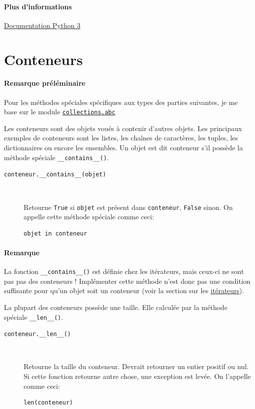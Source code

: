 \documentclass[a4paper, 10pt]{article}
\begin{document}
\paragraph{Plus d'informations} \href{https://docs.python.org/3/howto/descriptor.html}{Documentation Python 3}





\section{Conteneurs}

\paragraph{Remarque préléminaire} Pour les méthodes spéciales spécifiques aux types des parties suivantes, je me base sur le module \hyperref[abc]{\texttt{collections.abc}}\bigskip


Les conteneurs sont des objets voués à contenir d'autres objets. Les principaux exemples de conteneurs sont les listes, les chaînes de caractères, les tuples, les dictionnaires ou encore les ensembles. Un objet est dit conteneur s'il possède la méthode spéciale \texttt{__contains__()}.

\begin{description}
    \item[\texttt{conteneur.__contains__(objet)}]~

    Retourne \texttt{True} si \texttt{objet} est présent dans \texttt{conteneur}, \texttt{False} sinon. On appelle cette méthode spéciale comme ceci:
    \begin{verbatim}
objet in conteneur
    \end{verbatim}
\end{description}

\paragraph{Remarque} La fonction \texttt{__contains__()} est définie chez les itérateurs, mais ceux-ci ne sont pas pas des conteneurs ! Implémenter cette méthode n'est donc pas une condition suffisante pour qu'un objet soit un conteneur (voir la section sur les \hyperref[iterateur]{itérateurs}).\bigskip

La plupart des conteneurs possède une taille. Elle calculée par la méthode spéciale \texttt{__len__()}.
\begin{description}
    \item[\texttt{conteneur.__len__()}]~

    Retourne la taille du conteneur. Devrait retourner un entier positif ou nul. Si cette fonction retourne autre chose, une exception est levée. On l'appelle comme ceci:
    \begin{verbatim}
len(conteneur)
    \end{verbatim}
\end{description}
\end{document}

